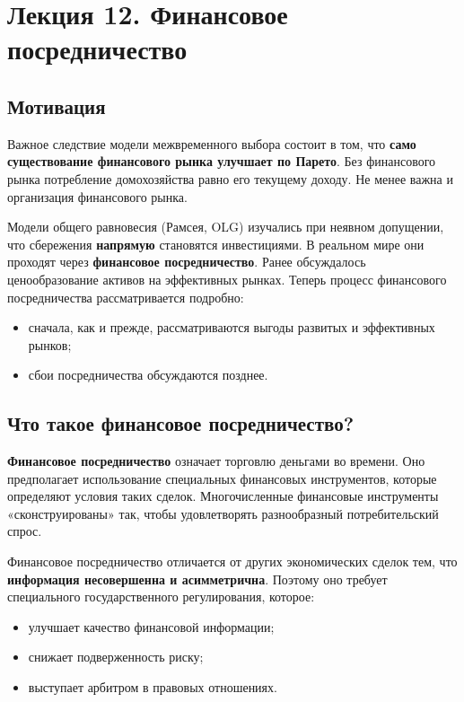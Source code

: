 \documentclass[10pt,a4paper]{article}
\begin{document}
\newpage
\section{Лекция 12. Финансовое посредничество}

\subsection{Мотивация}

Важное следствие модели межвременного выбора состоит в том, что \textbf{само существование финансового рынка улучшает по Парето}. Без финансового рынка потребление домохозяйства равно его текущему доходу. Не менее важна и организация финансового рынка.

Модели общего равновесия (Рамсея, OLG) изучались при неявном допущении, что сбережения \textbf{напрямую} становятся инвестициями. В реальном мире они проходят через \textbf{финансовое посредничество}. Ранее обсуждалось ценообразование активов на эффективных рынках. Теперь процесс финансового посредничества рассматривается подробно:
\begin{itemize}[leftmargin=1.3em]
\item сначала, как и прежде, рассматриваются выгоды развитых и эффективных рынков;
\item сбои посредничества обсуждаются позднее.
\end{itemize}

\subsection{Что такое финансовое посредничество?}

\textbf{Финансовое посредничество} означает торговлю деньгами во времени. Оно предполагает использование специальных финансовых инструментов, которые определяют условия таких сделок. Многочисленные финансовые инструменты «сконструированы» так, чтобы удовлетворять разнообразный потребительский спрос.

Финансовое посредничество отличается от других экономических сделок тем, что \textbf{информация несовершенна и асимметрична}. Поэтому оно требует специального государственного регулирования, которое:
\begin{itemize}[leftmargin=1.3em]
\item улучшает качество финансовой информации;
\item снижает подверженность риску;
\item выступает арбитром в правовых отношениях.
\end{itemize}
\end{document}
